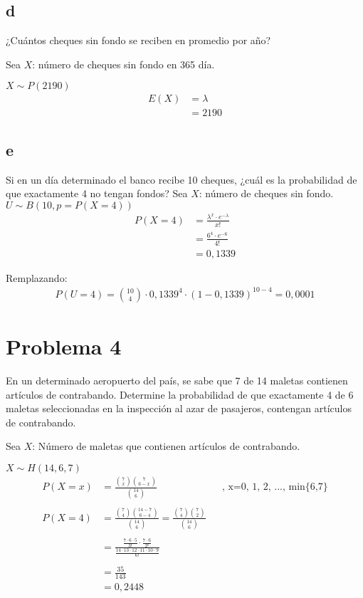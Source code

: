 \documentclass{templateNote}
\begin{document}
\newpage
\subsection{d}
¿Cuántos cheques sin fondo se reciben en promedio por año?

Sea $X$: número de cheques sin fondo en 365 día.

$X \sim P(2190)$
\begin{align*}
    E(X) &= \lambda \\
    &= 2190
\end{align*}
\subsection{e}
Si en un día determinado el banco recibe 10 cheques, ¿cuál es la probabilidad de que exactamente 4
no tengan fondos?
Sea $X$: número de cheques sin fondo.
$U \sim B(10, p = P(X=4))$
\begin{align*}
    P(X=4) &= \frac{\lambda^x \cdot e^{-\lambda}}{x!} \\
    &= \frac{6^4 \cdot e^{-6}}{4!} \\
    &= 0,1339
\end{align*}

Remplazando:
\begin{align*}
    P(U=4) = \binom{10}{4} \cdot 0,1339^4 \cdot (1-0,1339)^{10-4} = 0,0001
\end{align*}

\newpage
\section{Problema 4}
En un determinado aeropuerto del país, se sabe que 7 de 14 maletas contienen artículos de contrabando.
Determine la probabilidad de que exactamente 4 de 6 maletas seleccionadas en la inspección al azar de
pasajeros, contengan artículos de contrabando.

Sea $X$: Número de maletas que contienen artículos de contrabando.

$X \sim H(14, 6, 7)$
\begin{align*}
    P(X=x) &=  \frac{\displaystyle \binom{7}{x} \binom{7}{6-x}}{\displaystyle \binom{14}{6}}  && \text{, x=0, 1, 2, ..., min\{6,7\}}\\
    \\
    P(X=4) &= \frac{\displaystyle \binom{7}{4} \binom{14-7}{6-4}}{\displaystyle \binom{14}{6}} = \frac{\displaystyle \binom{7}{4} \binom{7}{2}}{\displaystyle \binom{14}{6}} \\
    \\
    &= \frac{\displaystyle \frac{7 \cdot 6 \cdot 5}{3!} \cdot \frac{7 \cdot 6}{2!}}{\displaystyle \frac{14 \cdot 13 \cdot 12 \cdot 11 \cdot 10 \cdot 9}{6!}} \\
    \\
    &= \frac{35}{143} \\
    &= 0,2448
\end{align*}
\end{document}
